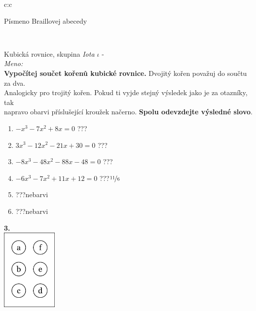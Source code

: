 \documentclass[10pt]{report}
\begin{document}
\begin{tabular}{c:c}
\begin{minipage}[c][99mm][t]{0.49\linewidth}
\begin{center}
\begin{minipage}{0.20\linewidth}
\begin{center}
{\small Písmeno Braillovej abecedy}
\end{center}
\end{minipage}
\end{center}
\end{minipage}
\\ \hdashline
\begin{minipage}[c][99mm][t]{0.49\linewidth}
\begin{center}
\vspace{7mm}
{\huge Kubická rovnice, skupina \textit{Iota $\iota$} -}\\[4.5mm]
\textit{Meno:}\phantom{xxxxxxxxxxxxxxxxxxxxxxxxxxxxxxxxxxxxxxxxxxxxxxxxxxxxxxxxxxxxxxxxx}\\[3.5mm]
\textbf{Vypočítej součet kořenů kubické rovnice.} Dvojitý kořen považuj do součtu za dva.\\Analogicky pro trojitý kořen. Pokud ti vyjde stejný výsledek jako je za otazníky, tak\\napravo obarvi příslušející kroužek načerno. \textbf{Spolu odevzdejte výsledné slovo}.\\[3mm]
\begin{minipage}{0.77\linewidth}
\begin{center}
\begin{varwidth}{\textwidth}
\begin{enumerate}
\large
\item $-x^3-7x^2+8x=0$\quad \dotfill\; ???\;\dotfill {}
\item $3x^3-12x^2-21x+30=0$\quad \dotfill\; ???\;\dotfill {}
\item $-8x^3-48x^2-88x-48=0$\quad \dotfill\; ???\;\dotfill {}
\item $-6x^3-7x^2+11x+12=0$\quad \dotfill\; ???\;\dotfill \quad $\nicefrac{11}{6}$
\item \quad \dotfill\; ???\;\dotfill \quad nebarvi
\item \quad \dotfill\; ???\;\dotfill \quad nebarvi
\end{enumerate}
\end{varwidth}
\end{center}
\end{minipage}
\begin{minipage}{0.20\linewidth}
\begin{center}
{\Huge\bfseries 3.} \\[2mm]
\includegraphics[height=40mm]{../images/braille.png}

\end{center}
\end{minipage}
\end{center}
\end{minipage}
\end{tabular}
\end{document}
